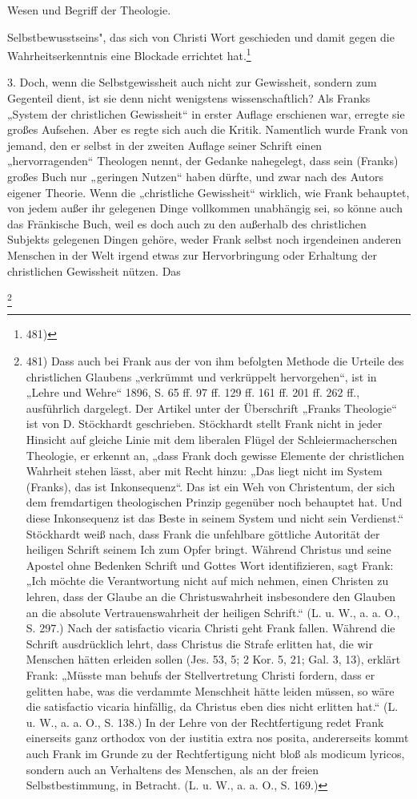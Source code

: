 Wesen und Begriff der Theologie.

Selbstbewusstseins", das sich von Christi Wort geschieden und damit gegen die Wahrheitserkenntnis eine Blockade errichtet hat.\footnote{481)}

3. Doch, wenn die Selbstgewissheit auch nicht zur Gewissheit, sondern zum Gegenteil dient, ist sie denn nicht wenigstens wissenschaftlich? Als Franks „System der christlichen Gewissheit“ in erster Auflage erschienen war, erregte sie großes Aufsehen. Aber es regte sich auch die Kritik. Namentlich wurde Frank von jemand, den er selbst in der zweiten Auflage seiner Schrift einen „hervorragenden“ Theologen nennt, der Gedanke nahegelegt, dass sein (Franks) großes Buch nur „geringen Nutzen“ haben dürfte, und zwar nach des Autors eigener Theorie. Wenn die „christliche Gewissheit“ wirklich, wie Frank behauptet, von jedem außer ihr gelegenen Dinge vollkommen unabhängig sei, so könne auch das Fränkische Buch, weil es doch auch zu den außerhalb des christlichen Subjekts gelegenen Dingen gehöre, weder Frank selbst noch irgendeinen anderen Menschen in der Welt irgend etwas zur Hervorbringung oder Erhaltung der christlichen Gewissheit nützen. Das

\footnote{481) Dass auch bei Frank aus der von ihm befolgten Methode die Urteile des christlichen Glaubens „verkrümmt und verkrüppelt hervorgehen“, ist in „Lehre und Wehre“ 1896, S. 65 ff. 97 ff. 129 ff. 161 ff. 201 ff. 262 ff., ausführlich dargelegt. Der Artikel unter der Überschrift „Franks Theologie“ ist von D. Stöckhardt geschrieben. Stöckhardt stellt Frank nicht in jeder Hinsicht auf gleiche Linie mit dem liberalen Flügel der Schleiermacherschen Theologie, er erkennt an, „dass Frank doch gewisse Elemente der christlichen Wahrheit stehen lässt, aber mit Recht hinzu: „Das liegt nicht im System (Franks), das ist Inkonsequenz“. Das ist ein Weh von Christentum, der sich dem fremdartigen theologischen Prinzip gegenüber noch behauptet hat. Und diese Inkonsequenz ist das Beste in seinem System und nicht sein Verdienst.“ Stöckhardt weiß nach, dass Frank die unfehlbare göttliche Autorität der heiligen Schrift seinem Ich zum Opfer bringt. Während Christus und seine Apostel ohne Bedenken Schrift und Gottes Wort identifizieren, sagt Frank: „Ich möchte die Verantwortung nicht auf mich nehmen, einen Christen zu lehren, dass der Glaube an die Christuswahrheit insbesondere den Glauben an die absolute Vertrauenswahrheit der heiligen Schrift.“ (L. u. W., a. a. O., S. 297.) Nach der satisfactio vicaria Christi geht Frank fallen. Während die Schrift ausdrücklich lehrt, dass Christus die Strafe erlitten hat, die wir Menschen hätten erleiden sollen (Jes. 53, 5; 2 Kor. 5, 21; Gal. 3, 13), erklärt Frank: „Müsste man behufs der Stellvertretung Christi fordern, dass er gelitten habe, was die verdammte Menschheit hätte leiden müssen, so wäre die satisfactio vicaria hinfällig, da Christus eben dies nicht erlitten hat.“ (L. u. W., a. a. O., S. 138.) In der Lehre von der Rechtfertigung redet Frank einerseits ganz orthodox von der iustitia extra nos posita, andererseits kommt auch Frank im Grunde zu der Rechtfertigung nicht bloß als modicum lyricos, sondern auch an Verhaltens des Menschen, als an der freien Selbstbestimmung, in Betracht. (L. u. W., a. a. O., S. 169.)}